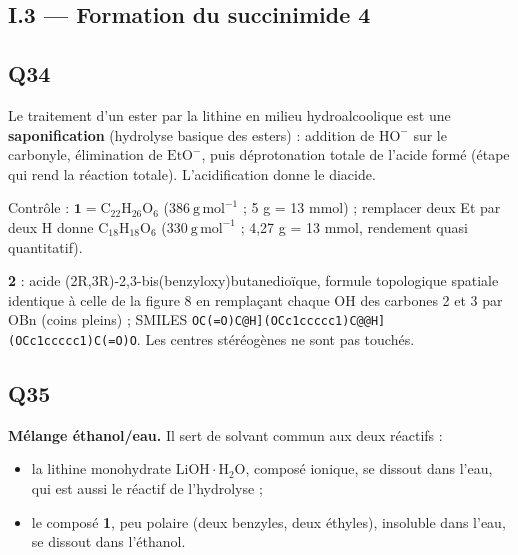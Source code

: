 \documentclass[11pt,a4paper]{article}
\providecommand{\tightlist}{\setlength{\itemsep}{0pt}\setlength{\parskip}{0pt}}
\begin{document}
\hypertarget{i.3-formation-du-succinimide-4}{%
\subsection{I.3 --- Formation du succinimide 4}\label{i.3-formation-du-succinimide-4}}

\hypertarget{q34}{%
\subsection{Q34}\label{q34}}

Le traitement d'un ester par la lithine en milieu hydroalcoolique est une \textbf{saponification} (hydrolyse basique des esters) : addition de \(\mathrm{HO^-}\) sur le carbonyle, élimination de \(\mathrm{EtO^-}\), puis déprotonation totale de l'acide formé (étape qui rend la réaction totale). L'acidification donne le diacide.

Contrôle : \(\mathbf 1=\mathrm{C_{22}H_{26}O_6}\) (\(386\ \mathrm{g\,mol^{-1}}\) ; 5 g = 13 mmol) ; remplacer deux Et par deux H donne \(\mathrm{C_{18}H_{18}O_6}\) (\(330\ \mathrm{g\,mol^{-1}}\) ; 4,27 g = 13 mmol, rendement quasi quantitatif).

\textbf{2} : acide (2R,3R)-\allowbreak{}2,3-\allowbreak{}bis(benzyloxy)butanedioïque, formule topologique spatiale identique à celle de la figure 8 en remplaçant chaque OH des carbones 2 et 3 par OBn (coins pleins) ; SMILES \texttt{OC(\allowbreak{}=\allowbreak{}O)\allowbreak{}{[}C@H{]}\allowbreak{}(\allowbreak{}OCc1ccccc1)\allowbreak{}{[}C@@H{]}\allowbreak{}(\allowbreak{}OCc1ccccc1)\allowbreak{}C(\allowbreak{}=\allowbreak{}O)\allowbreak{}O}. Les centres stéréogènes ne sont pas touchés.

\hypertarget{q35}{%
\subsection{Q35}\label{q35}}

\textbf{Mélange éthanol/eau.} Il sert de solvant commun aux deux réactifs :

\begin{itemize}
\tightlist
\item
  la lithine monohydrate \(\mathrm{LiOH{\cdot}H_2O}\), composé ionique, se dissout dans l'eau, qui est aussi le réactif de l'hydrolyse ;
\item
  le composé \textbf{1}, peu polaire (deux benzyles, deux éthyles), insoluble dans l'eau, se dissout dans l'éthanol.
\end{itemize}
\end{document}

